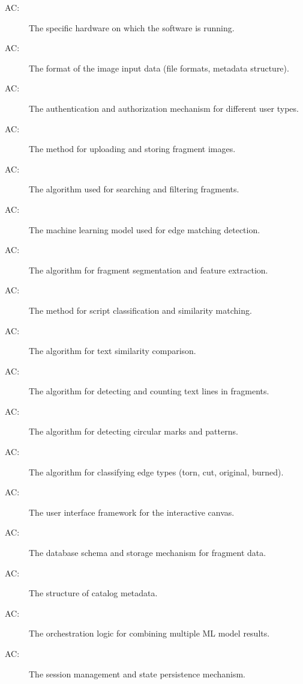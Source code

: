 \documentclass[12pt, titlepage]{article}
\newcounter{acnum}
\newcommand{\actheacnum}{AC\theacnum}
\begin{document}
\begin{description}
\item[ \actheacnum \label{acHardware}:] The specific
  hardware on which the software is running.
\item[ \actheacnum \label{acInput}:] The format of the
  image input data (file formats, metadata structure).
\item[ \actheacnum \label{acAuth}:] The authentication
  and authorization mechanism for different user types.
\item[ \actheacnum \label{acUpload}:] The method for
  uploading and storing fragment images.
\item[ \actheacnum \label{acSearch}:] The algorithm used
  for searching and filtering fragments.
\item[ \actheacnum \label{acEdgeMatch}:] The machine
  learning model used for edge matching detection.
\item[ \actheacnum \label{acDamage}:] The algorithm for
  fragment segmentation and feature extraction.
\item[ \actheacnum \label{acScript}:] The method for
  script classification and similarity matching.
\item[ \actheacnum \label{acTextSim}:] The algorithm for
  text similarity comparison.
\item[ \actheacnum \label{acLineCount}:] The algorithm for
  detecting and counting text lines in fragments.
\item[ \actheacnum \label{acCircleRec}:] The algorithm for
  detecting circular marks and patterns.
\item[ \actheacnum \label{acEdgeClass}:] The algorithm for
  classifying edge types (torn, cut, original, burned).
\item[ \actheacnum \label{acCanvas}:] The user interface
  framework for the interactive canvas.
\item[ \actheacnum \label{acFragStore}:] The database
  schema and storage mechanism for fragment data.
\item[ \actheacnum \label{acCatalog}:] The structure of
  catalog metadata.
\item[ \actheacnum \label{acMatchOrch}:] The orchestration
  logic for combining multiple ML model results.
\item[ \actheacnum \label{acSession}:] The session
  management and state persistence mechanism.
\end{description}
\end{document}
